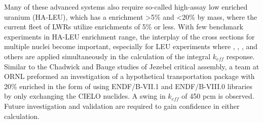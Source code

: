 \documentclass[letterpaper]{ar-1col}
\begin{document}
Many of these advanced systems also require so-called high-assay low enriched uranium (HA-LEU), which has a  enrichment \textgreater5\% and \textless20\% by mass, where the current fleet of LWRs utilize enrichments of 5\% or less.
With few benchmark experiments in HA-LEU enrichment range, the interplay of the cross sections for multiple nuclei become important, especially for LEU experiments where , , ,  and others are applied simultaneously in the calculation of the integral $k_{eff}$ response.
 Similar to the Chadwick \cite{Cha18} and Bauge \cite{Bau12} studies of Jezebel critical assembly, a team at ORNL preformed an investigation of a hypothetical transportation package with 20\% enriched  in the form of  using ENDF/B-VII.1 and ENDF/B-VIII.0 libraries by only exchanging the CIELO nuclides.
A swing in $k_{eff}$ of 450 pcm is observed.
 Future investigation and validation are required to gain confidence in either calculation.
\end{document}
